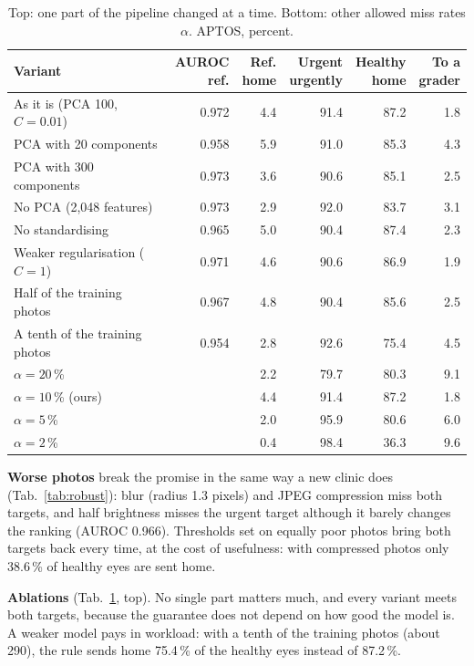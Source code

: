 \documentclass[10pt,twocolumn,letterpaper]{article}
\newcommand{\pct}{\,\%}
\begin{document}
\begin{table}[t]\centering\small
\begin{adjustbox}{max width=\linewidth}\begin{tabular}{@{}lrrrrr@{}}\toprule
Variant & \shortstack{AUROC\\ref.} & \shortstack{Ref.\\home} & \shortstack{Urgent\\urgently} & \shortstack{Healthy\\home} & \shortstack{To a\\grader}\\\midrule
As it is (PCA 100, $C=0.01$) & 0.972 & 4.4 & 91.4 & 87.2 & 1.8\\
PCA with 20 components & 0.958 & 5.9 & 91.0 & 85.3 & 4.3\\
PCA with 300 components & 0.973 & 3.6 & 90.6 & 85.1 & 2.5\\
No PCA (2,048 features) & 0.973 & 2.9 & 92.0 & 83.7 & 3.1\\
No standardising & 0.965 & 5.0 & 90.4 & 87.4 & 2.3\\
Weaker regularisation ($C=1$) & 0.971 & 4.6 & 90.6 & 86.9 & 1.9\\
Half of the training photos & 0.967 & 4.8 & 90.4 & 85.6 & 2.5\\
A tenth of the training photos & 0.954 & 2.8 & 92.6 & 75.4 & 4.5\\\midrule
$\alpha=20$\pct & & 2.2 & 79.7 & 80.3 & 9.1\\
$\alpha=10$\pct{} (ours) & & 4.4 & 91.4 & 87.2 & 1.8\\
$\alpha=5$\pct & & 2.0 & 95.9 & 80.6 & 6.0\\
$\alpha=2$\pct & & 0.4 & 98.4 & 36.3 & 9.6\\\bottomrule
\end{tabular}\end{adjustbox}
\caption{Top: one part of the pipeline changed at a time. Bottom: other allowed miss rates $\alpha$. APTOS, percent.}\label{tab:abl}
\end{table}
\textbf{Worse photos} break the promise in the same way a new clinic does (Tab.~\ref{tab:robust}): blur (radius 1.3 pixels) and JPEG compression miss both targets, and half brightness misses the urgent target although it barely changes the ranking (AUROC 0.966). Thresholds set on equally poor photos bring both targets back every time, at the cost of usefulness: with compressed photos only 38.6\pct{} of healthy eyes are sent home.

\textbf{Ablations} (Tab.~\ref{tab:abl}, top). No single part matters much, and every variant meets both targets, because the guarantee does not depend on how good the model is. A weaker model pays in workload: with a tenth of the training photos (about 290), the rule sends home 75.4\pct{} of the healthy eyes instead of 87.2\pct.
\end{document}
